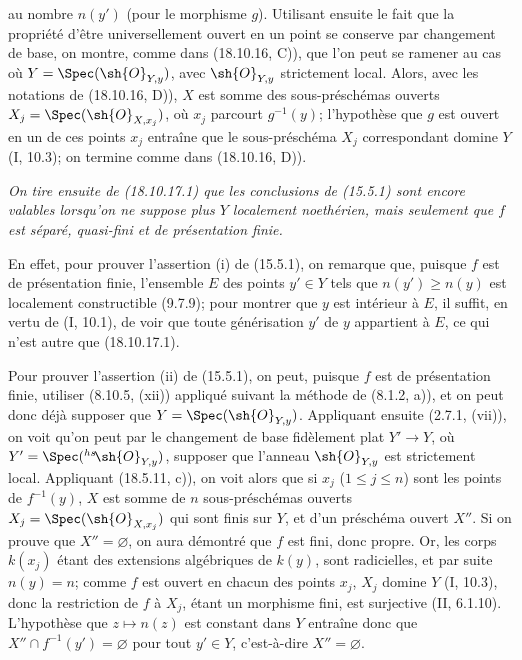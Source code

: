 
au nombre $n(y')$ (pour le morphisme $g$). Utilisant ensuite le fait que la propriété d'être universellement ouvert en un point se conserve par changement de base, on montre, comme dans (18.10.16, C)), que l'on peut se ramener au cas où $Y=\Spec(\sh{O}_{Y,y})$, avec $\sh{O}_{Y,y}$ strictement local. Alors, avec les notations de (18.10.16, D)), $X$ est somme des sous-préschémas ouverts $X_j=\Spec(\sh{O}_{X,x_j})$, où $x_j$ parcourt $g^{-1}(y)$; l'hypothèse que $g$ est ouvert en un de ces points $x_j$ entraîne que le sous-préschéma $X_j$ correspondant domine $Y$ (I, 10.3); on termine comme dans (18.10.16, D)).

\emph{On tire ensuite de (18.10.17.1) que les conclusions de (15.5.1) sont encore valables lorsqu'on ne suppose plus $Y$ localement noethérien, mais seulement que $f$ est séparé, quasi-fini et de présentation finie.}

En effet, pour prouver l'assertion (i) de (15.5.1), on remarque que, puisque $f$ est de présentation finie, l'ensemble $E$ des points $y'\in Y$ tels que $n(y')\geq n(y)$ est localement constructible (9.7.9); pour montrer que $y$ est intérieur à $E$, il suffit, en vertu de (I, 10.1), de voir que toute générisation $y'$ de $y$ appartient à $E$, ce qui n'est autre que (18.10.17.1).

Pour prouver l'assertion (ii) de (15.5.1), on peut, puisque $f$ est de présentation finie, utiliser (8.10.5, (xii)) appliqué suivant la méthode de (8.1.2, a)), et on peut donc déjà supposer que $Y=\Spec(\sh{O}_{Y,y})$. Appliquant ensuite (2.7.1, (vii)), on voit qu'on peut par le changement de base fidèlement plat $Y'\to Y$, où $Y'=\Spec({}^{hs}\!\sh{O}_{Y,y})$, supposer que l'anneau $\sh{O}_{Y,y}$ est strictement local. Appliquant (18.5.11, c)), on voit alors que si $x_j$ ($1\leq j\leq n$) sont les points de $f^{-1}(y)$, $X$ est somme de $n$ sous-préschémas ouverts $X_j=\Spec(\sh{O}_{X,x_j})$ qui sont finis sur $Y$, et d'un préschéma ouvert $X''$. Si on prouve que $X''=\varnothing$, on aura démontré que $f$ est fini, donc propre. Or, les corps $k(x_j)$ étant des extensions algébriques de $k(y)$, sont radicielles, et par suite $n(y)=n$; comme $f$ est ouvert en chacun des points $x_j$, $X_j$ domine $Y$ (I, 10.3), donc la restriction de $f$ à $X_j$, étant un morphisme fini, est surjective (II, 6.1.10). L'hypothèse que $z\mapsto n(z)$ est constant dans $Y$ entraîne donc que $X''\cap f^{-1}(y')=\varnothing$ pour tout $y'\in Y$, c'est-à-dire $X''=\varnothing$.

